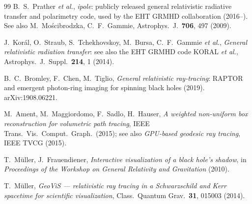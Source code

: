\begin{thebibliography}{99}
B.~S.~Prather \emph{et al.},
\emph{ipole}: publicly released general relativistic radiative transfer and
polarimetry code, used by the EHT GRMHD collaboration (2016--).
See also M.~Mo\'scibrodzka, C.~F.~Gammie, Astrophys.\ J.\ \textbf{706}, 497 (2009).

J.~Kor\'al, O.~Straub, S.~Tchekhovskoy, M.~Bursa, C.~F.~Gammie \emph{et al.},
\emph{General relativistic radiation transfer}: see also the EHT GRMHD code
\textsc{KORAL} \emph{et al.}, Astrophys.\ J.\ Suppl.\ \textbf{214}, 1 (2014).

B.~C.~Bromley, F.~Chen, M.~Tiglio,
\emph{General relativistic ray-tracing}: \textsc{RAPTOR} and emergent
photon-ring imaging for spinning black holes (2019). arXiv:1908.06221.

M.~Ament, M.~Maggiordomo, F.~Sadlo, H.~Hauser,
\emph{A weighted non-uniform box reconstruction for volumetric
path tracing}, IEEE Trans.\ Vis.\ Comput.\ Graph.\ (2015);
see also \emph{GPU-based geodesic ray tracing}, IEEE TVCG (2015).

T.~M\"uller, J.~Frauendiener,
\emph{Interactive visualization of a black hole's shadow},
in \emph{Proceedings of the Workshop on General Relativity and Gravitation} (2010).

T.~M\"uller,
\emph{GeoViS --- relativistic ray tracing in a Schwarzschild and Kerr spacetime
for scientific visualization}, Class.\ Quantum Grav.\ \textbf{31}, 015003 (2014).

\end{thebibliography}
